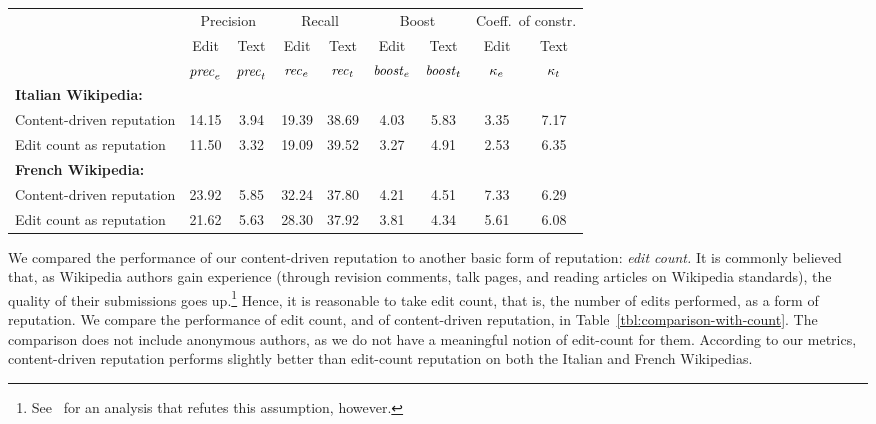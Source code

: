 \begin{sidewaystable}
\begin{center}
\begin{tabular}{|l||c|c||c|c||c|c||c|c|} \hline
 & \multicolumn{2}{|c||}{Precision}
 & \multicolumn{2}{|c||}{Recall}
 & \multicolumn{2}{|c||}{Boost}
 & \multicolumn{2}{|c|}{Coeff.\ of constr.} \\
 & Edit & Text & Edit & Text  & Edit & Text & Edit & Text \\
 & ${\text{\textit{prec}}}_e$ & ${\text{\textit{prec}}}_t$ & ${\text{\textit{rec}}}_e$ & ${\text{\textit{rec}}}_t$ & ${\text{\textit{boost}}}_e$ & ${\text{\textit{boost}}}_t$
 & $\kappa_e$ & $\kappa_t$ \\[0.5ex] \hline
\textbf{Italian Wikipedia:} & & & & & & & & \\
\qquad Content-driven reputation & 14.15 &  3.94 & 19.39 & 38.69 & 4.03 & 5.83 & 3.35 & 7.17 \\
\qquad Edit count as reputation  & 11.50 &  3.32 & 19.09 & 39.52 & 3.27 & 4.91 & 2.53 & 6.35 \\ \hline
\textbf{French Wikipedia:} & & & & & & & & \\
\qquad Content-driven reputation & 23.92 &  5.85 & 32.24 & 37.80 & 4.21 & 4.51 & 7.33 & 6.29 \\
\qquad Edit count as reputation &  21.62 &  5.63 & 28.30 & 37.92 & 3.81 & 4.34 & 5.61 & 6.08 \\ \hline
\end{tabular}
\end{center}
\caption{Summary of the performance of content-driven reputation over
the Italian and French Wikipedias. All data are expressed as
percentages. Anonymous authors are not included in the comparison.
Precision is the probability that the text or edit longevity is low,
given that the reputation is low.
Recall is the probability that the reputation is low, given
that the text or edit longevity is low.
}
\label{tbl:comparison-with-count}
\end{sidewaystable}

We compared the performance of our content-driven reputation to
another basic form of reputation: {\em edit count.}
It is commonly believed that, as Wikipedia authors gain experience
(through revision comments, talk pages, and reading articles on
Wikipedia standards), the quality of their submissions goes
up.\footnote{See~\cite{Halfaker2011} for an analysis that refutes
this assumption, however.}
Hence, it is reasonable to take edit count, that is, the number of
edits performed, as a form of reputation.
We compare the performance of edit count, and of content-driven
reputation, in Table~\ref{tbl:comparison-with-count}.
The comparison does not include anonymous authors, as we do not have a
meaningful notion of edit-count for them.
According to our metrics, content-driven reputation
performs slightly better than edit-count reputation on both the Italian
and French Wikipedias.

